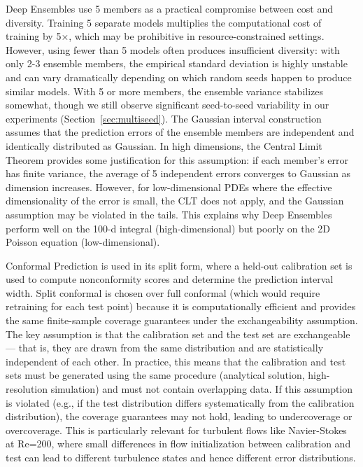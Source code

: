 \documentclass[12pt,a4paper]{article}
\theoremstyle{plain}
\begin{document}
Deep Ensembles use 5 members as a practical compromise between cost and
diversity. Training 5 separate models multiplies the computational cost of
training by 5×, which may be prohibitive in resource-constrained settings.
However, using fewer than 5 models often produces insufficient diversity:
with only 2-3 ensemble members, the empirical standard deviation is highly
unstable and can vary dramatically depending on which random seeds happen to
produce similar models. With 5 or more members, the ensemble variance
stabilizes somewhat, though we still observe significant seed-to-seed
variability in our experiments (Section~\ref{sec:multiseed}). The Gaussian
interval construction assumes that the prediction errors of the ensemble
members are independent and identically distributed as Gaussian. In high
dimensions, the Central Limit Theorem provides some justification for this
assumption: if each member's error has finite variance, the average of
5 independent errors converges to Gaussian as dimension increases. However,
for low-dimensional PDEs where the effective dimensionality of the error is
small, the CLT does not apply, and the Gaussian assumption may be violated
in the tails. This explains why Deep Ensembles perform well on the 100-d
integral (high-dimensional) but poorly on the 2D Poisson equation
(low-dimensional).

Conformal Prediction is used in its split form, where a held-out calibration
set is used to compute nonconformity scores and determine the prediction
interval width. Split conformal is chosen over full conformal (which would
require retraining for each test point) because it is computationally
efficient and provides the same finite-sample coverage guarantees under
the exchangeability assumption. The key assumption is that the calibration
set and the test set are exchangeable --- that is, they are drawn from the
same distribution and are statistically independent of each other. In
practice, this means that the calibration and test sets must be generated
using the same procedure (analytical solution, high-resolution simulation)
and must not contain overlapping data. If this assumption is violated
(e.g., if the test distribution differs systematically from the calibration
distribution), the coverage guarantees may not hold, leading to undercoverage
or overcoverage. This is particularly relevant for turbulent flows like
Navier-Stokes at Re=200, where small differences in flow initialization
between calibration and test can lead to different turbulence states and
hence different error distributions.
\end{document}

